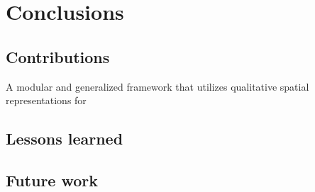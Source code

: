 
\chapter{Conclusions}

\section{Contributions}
A modular and generalized framework that utilizes qualitative spatial representations for 

\section{Lessons learned}


\section{Future work}
